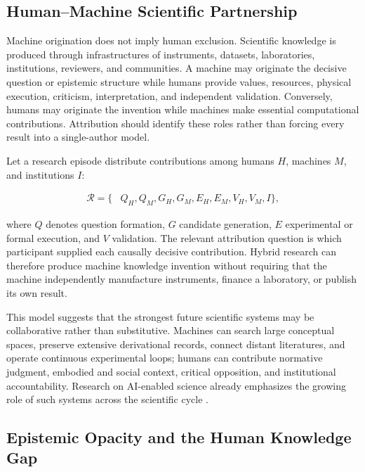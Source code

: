 \subsection{\textbf{Human--Machine Scientific Partnership}}

Machine origination does not imply human exclusion. Scientific knowledge is
produced through infrastructures of instruments, datasets, laboratories,
institutions, reviewers, and communities. A machine may originate the decisive
question or epistemic structure while humans provide values, resources,
physical execution, criticism, interpretation, and independent validation.
Conversely, humans may originate the invention while machines make essential
computational contributions. Attribution should identify these roles rather
than forcing every result into a single-author model.

Let a research episode distribute contributions among humans $H$, machines
$M$, and institutions $I$:

\begin{equation}
\begin{aligned}
\mathcal{R}
=\{&Q_H,Q_M,
G_H,G_M,
E_H,E_M,
V_H,V_M,
I\},
\end{aligned}
\label{eq:distributed_research_roles}
\end{equation}

where $Q$ denotes question formation, $G$ candidate generation, $E$
experimental or formal execution, and $V$ validation. The relevant attribution
question is which participant supplied each causally decisive contribution.
Hybrid research can therefore produce machine knowledge invention without
requiring that the machine independently manufacture instruments, finance a
laboratory, or publish its own result.

This model suggests that the strongest future scientific systems may be
collaborative rather than substitutive. Machines can search large conceptual
spaces, preserve extensive derivational records, connect distant literatures,
and operate continuous experimental loops; humans can contribute normative
judgment, embodied and social context, critical opposition, and institutional
accountability. Research on AI-enabled science already emphasizes the growing
role of such systems across the scientific cycle \cite{wang2023scientific}.

\subsection{\textbf{Epistemic Opacity and the Human Knowledge Gap}}

